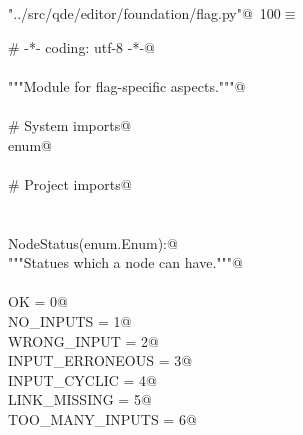 \documentclass[
    a4paper,      %
    10pt,         %
    openright,    %
    notitlepage,  %
    parskip=half, %
]{scrreprt}       %
\theoremstyle{definition}                    %
\begin{document}
\begin{flushleft} \small
\begin{minipage}{\linewidth}\label{scrap162}\raggedright\small
{} \verb@"../src/qde/editor/foundation/flag.py"@\nobreak\ {\footnotesize {100}}$\equiv$
\vspace{-1ex}
\begin{list}{}{} \item
\mbox{}\lstinline@# -*- coding: utf-8 -*-@\\
\mbox{}\lstinline@@\\
\mbox{}\lstinline@"""Module for flag-specific aspects."""@\\
\mbox{}\lstinline@@\\
\mbox{}\lstinline@# System imports@\\
\mbox{}\lstinline@import enum@\\
\mbox{}\lstinline@@\\
\mbox{}\lstinline@# Project imports@\\
\mbox{}\lstinline@@\\
\mbox{}\lstinline@@\\
\mbox{}\lstinline@class NodeStatus(enum.Enum):@\\
\mbox{}\lstinline@    """Statues which a node can have."""@\\
\mbox{}\lstinline@@\\
\mbox{}\lstinline@    OK              = 0@\\
\mbox{}\lstinline@    NO_INPUTS       = 1@\\
\mbox{}\lstinline@    WRONG_INPUT     = 2@\\
\mbox{}\lstinline@    INPUT_ERRONEOUS = 3@\\
\mbox{}\lstinline@    INPUT_CYCLIC    = 4@\\
\mbox{}\lstinline@    LINK_MISSING    = 5@\\
\mbox{}\lstinline@    TOO_MANY_INPUTS = 6@\\
\mbox{}\lstinline@@{\NWsep}
\end{list}
\vspace{-1.5ex}
\footnotesize
\begin{list}{}{\setlength{\itemsep}{-\parsep}\setlength{\itemindent}{-\leftmargin}}

\item{}
\end{list}
\end{minipage}\vspace{4ex}
\end{flushleft}
\end{document}
